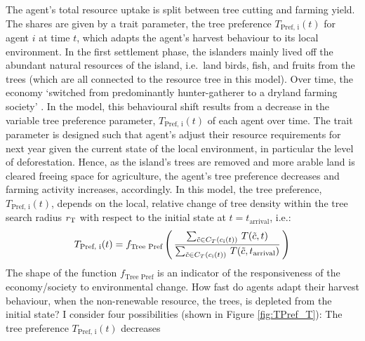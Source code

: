 The agent's total resource uptake is split between tree cutting and farming yield.
The shares are given by a trait parameter, the tree preference $T_\text{Pref, i}(t)$ for agent $i$ at time $t$, which adapts the agent's harvest behaviour to its local environment.
In the first settlement phase, the islanders mainly lived off the abundant natural resources of the island, i.e.\ land birds, fish, and fruits from the trees \citet{Bahn2017} (which are all connected to the resource tree in this model). 
Over time, the economy `switched from predominantly hunter-gatherer to a dryland farming society' \citep{Louwagie2006}.
In the model, this behavioural shift results from a decrease in the variable tree preference parameter, $T_\text{Pref, i}(t)$ of each agent over time.
The trait parameter is designed such that agent's adjust their resource requirements for next year given the current state of the local environment, in particular the level of deforestation. 
Hence, as the island's trees are removed and more arable land is cleared freeing space for agriculture, the agent's tree preference decreases and farming activity increases, accordingly.
In this model, the tree preference, $T_\text{Pref, i}(t)$, depends on the local, relative change of tree density within the tree search radius $r_{\rm T}$ with respect to the initial state at $t=t_\text{arrival}$, i.e.:
\begin{equation}\label{eq:TPref}
T_\text{Pref, i}(t) = f_\text{Tree Pref}\left( \, \frac{\sum_{\tilde{c} \in C_{T}(c_{\rm i}(t)) } \, T(\tilde{c}, t)}{\sum_{\tilde{c} \in C_{T}(c_{\rm i}(t))} \, T(\tilde{c}, t_\text{arrival}) } \, \right)
\end{equation}
The shape of the function $f_\text{Tree Pref}$ is an indicator of the responsiveness of the economy/society to environmental change. How fast do agents adapt their harvest behaviour, when the non-renewable resource, the trees, is depleted from the initial state?  
I consider four possibilities (shown in Figure \ref{fig:TPref_T}): The tree preference $T_\text{Pref, i}(t)$ decreases
